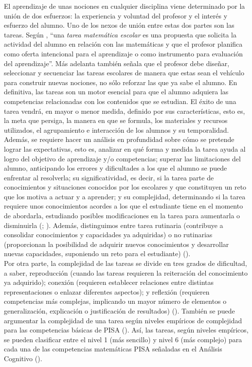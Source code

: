 \documentclass[../main.tex]{memoir}
\begin{document}
El aprendizaje de unas nociones en cualquier disciplina viene determinado  por la unión de dos esfuerzos: la experiencia y voluntad del profesor y el interés y esfuerzo del alumno. Uno de los nexos de unión entre estas dos partes son las tareas. Según \cite{rico2016}, ``una \textit{tarea matemática escolar} es una propuesta que solicita la actividad del alumno en relación con las matemáticas y que el profesor planifica como oferta intencional para el aprendizaje o como instrumento para evaluación del aprendizaje''. Más adelanta también señala que el profesor debe diseñar, seleccionar y secuenciar las tareas escolares de manera que estas sean el vehículo para construir nuevas nociones, no sólo reforzar las que ya sabe el alumno. En definitiva, las tareas son un motor esencial para que el alumno adquiera las competencias relacionadas con los contenidos que se estudian. El éxito de una tarea vendrá, en mayor o menor medida, definido por sus características, esto es, la meta que persiga, la manera en que se formula, los materiales y recursos utilizados, el agrupamiento e interacción de los alumnos y su temporalidad. Además, se requiere hacer un análisis en profundidad sobre cómo se pretende lograr las expectativas, esto es, analizar en qué forma y medida la tarea ayuda al logro del objetivo de aprendizaje y/o competencias; superar las limitaciones del alumno, anticipando los errores y dificultades a los que el alumno se puede enfrentar al resolverla; su significatividad, es decir, si la tarea parte de conocimientos y situaciones conocidos por los escolares y que constituyen un reto que los motiva a actuar y a aprender; y su complejidad, determinando si la tarea requiere unos conocimientos acordes a los que el estudiante tiene en el momento de abordarla, estudiando posibles modificaciones en la tarea para aumentarla o disminuirla (\cite{rico2016}; \cite{lupi2013}). Además, distinguimos entre tarea rutinaria (contribuye a consolidar conocimientos y capacidades ya adquiridas) o no rutinarias (proporcionan la posibilidad de adquirir nuevos conocimientos y desarrollar nuevas capacidades, suponiendo un reto para el estudiante) (\cite{rico2016}). \\

Por otra parte, la complejidad de las tareas se divide en tres grados de dificultad, a saber, reproducción (cuando las tareas requieren la reiteración del conocimiento ya adquirido); conexión (requieren establecer relaciones entre distintas representaciones o enlazar diferentes aspectos); y reflexión (requieren competencias más complejas, implicando un mayor número de elementos o generalización, explicación o justificación de resultados) (\cite{rico2016}). También se puede argumentar la complejidad de una tarea según niveles empíricos de complejidad para las competencias básicas de PISA (\cite{pisaocde}). Así, las tareas, según niveles empíricos, se pueden clasificar entre el nivel 1 (más sencillo) y nivel 6 (más complejo) para cada una de las competencias matemáticas PISA señaladas en el Análisis Cognitivo (\cite{rico2016}). \\
\end{document}
